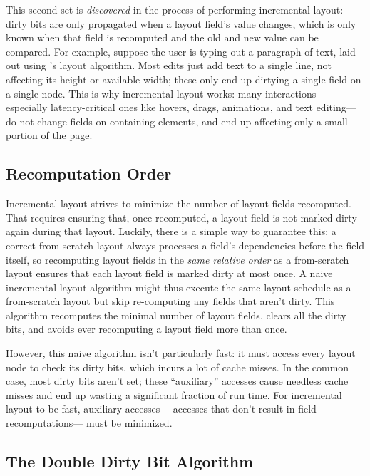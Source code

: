 This second set is \emph{discovered}
  in the process of performing incremental layout:
  dirty bits are only propagated
  when a layout field's value changes,
  which is only known when that field is recomputed
  and the old and new value can be compared.
For example, suppose the user is typing out a paragraph of text,
  laid out using 's layout algorithm.
Most edits just add text to a single line,
  not affecting its height or available width;
  these only end up dirtying a single field on a single node.
This is why incremental layout works:
  many interactions---%
  especially latency-critical ones like
  hovers, drags, animations, and text editing---%
  do not change fields on containing elements,
  and end up affecting only a small portion of the page.

\subsection{Recomputation Order}

Incremental layout strives to minimize
  the number of layout fields recomputed.
That requires ensuring that, once recomputed,
  a layout field is not marked dirty again during that layout.
Luckily, there is a simple way to guarantee this:
  a correct from-scratch layout
  always processes a field's dependencies before the field itself,
  so recomputing layout fields
  in the \emph{same relative order} as a from-scratch layout
  ensures that each layout field is marked dirty at most once.
A naive incremental layout algorithm might thus
  execute the same layout schedule as a from-scratch layout
  but skip re-computing any fields that aren't dirty.
This algorithm recomputes the minimal number of layout fields,
  clears all the dirty bits,
  and avoids ever recomputing a layout field more than once.

However, this naive algorithm isn't particularly fast:
  it must access every layout node to check its dirty bits,
  which incurs a lot of cache misses.
In the common case, most dirty bits aren't set;
  these ``auxiliary'' accesses cause needless cache misses
  and end up wasting a significant fraction of run time.
For incremental layout to be fast,
  auxiliary accesses---%
  accesses that don't result in field recomputations---%
  must be minimized.

\subsection{The Double Dirty Bit Algorithm}

